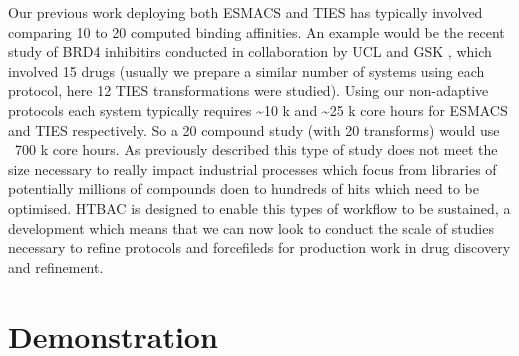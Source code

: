 \documentclass[conference]{IEEEtran}
\begin{document}
Our previous work deploying both ESMACS and TIES has typically involved comparing 10 to 20 computed
binding affinities.
An example would be the recent study of BRD4 inhibitirs conducted in collaboration by UCL and GSK \cite{Wan2017brd4}, which involved 15 drugs (usually we prepare a similar number of systems using each protocol, here 12 TIES transformations were studied).
Using our non-adaptive protocols each system typically requires \textasciitilde 10 k and \textasciitilde 25 k core hours for ESMACS and TIES respectively.
So a 20 compound study (with 20 transforms) would  use ~700 k core hours.
As previously described this type of study does not meet the size necessary to really impact industrial processes which focus from libraries of potentially millions of compounds doen to hundreds of hits which need to be optimised.
HTBAC is designed to enable this types of workflow to be sustained, a development which means that we can now look to conduct the scale of studies necessary to refine protocols and forcefileds for production work in drug discovery and refinement.



\section{Demonstration}\label{sec:demo}




\end{document}
